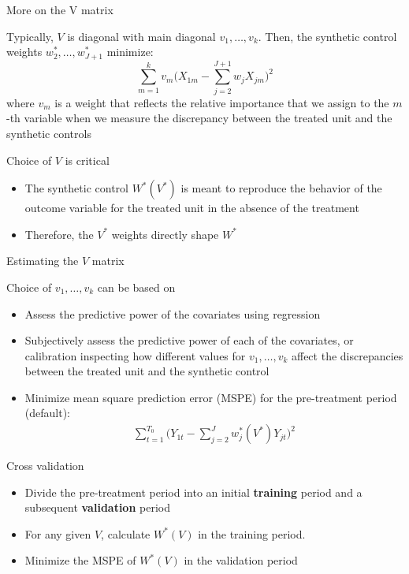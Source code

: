 \documentclass{beamer}
\begin{document}
\begin{frame}{More on the V matrix}

Typically, $V$ is diagonal with main diagonal $v_1, \dots, v_k$.  Then, the synthetic control weights $w_2^*, \dots, w_{J+1}^*$ minimize: $$\sum_{m=1}^k v_m \bigg(X_{1m} - \sum_{j=2}^{J+1}w_jX_{jm}\bigg)^2$$ where $v_m$ is a weight that reflects the relative importance that we assign to the $m$-th variable when we measure the discrepancy between the treated unit and the synthetic controls

\end{frame}

\begin{frame}{Choice of $V$ is critical}
	
		\begin{itemize}
		\item The synthetic control $W^*(V^*)$ is meant to reproduce the behavior of the outcome variable for the treated unit in the absence of the treatment
		\item Therefore, the $V^*$ weights directly shape $W^*$
		\end{itemize}
\end{frame}

\begin{frame}{Estimating the $V$ matrix}
	
 Choice of $v_1, \dots, v_k$ can be based on
		\begin{itemize}
		\item Assess the predictive power of the covariates using regression
		\item Subjectively assess the predictive power of each of the covariates, or calibration inspecting how different values for $v_1, \dots, v_k$ affect the discrepancies between the treated unit and the synthetic control
		\item Minimize mean square prediction error (MSPE) for the pre-treatment period (default):
			\begin{eqnarray*}
			\sum_{t=1}^{T_0} \bigg(Y_{1t} - \sum_{j=2}^J w_j^*(V^*)Y_{jt} \bigg)^2
			\end{eqnarray*}
		\end{itemize}
\end{frame}

\begin{frame}{Cross validation}

\begin{itemize}
		\item Divide the pre-treatment period into an initial \textbf{training} period and a subsequent \textbf{validation} period
		\item For any given $V$, calculate $W^*(V)$ in the training period.
		\item Minimize the MSPE of $W^*(V)$ in the validation period
\end{itemize}

\end{frame}
\end{document}
